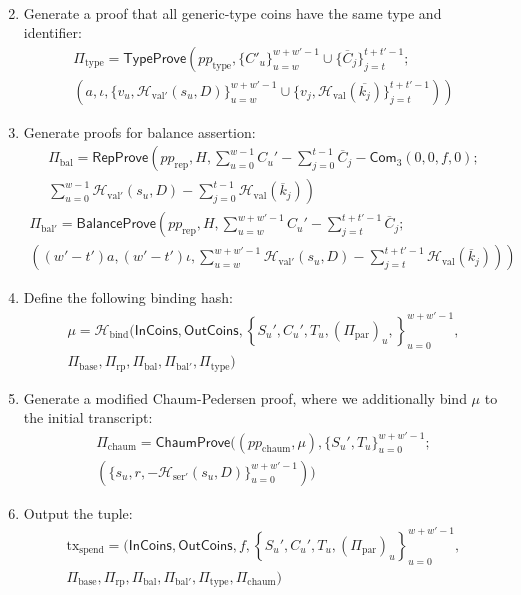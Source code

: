 \documentclass{article}
\newcommand{\func}[1]{\mathsf{#1}}
\newcommand{\com}{\func{Com}}
\newcommand{\hash}{\mathcal{H}}
\begin{document}
\begin{enumerate}
\begin{multline*}
    \end{multline*}
    \item Generate a proof that all generic-type coins have the same type and identifier:
    \begin{multline*}
        \Pi_{\text{type}} = \func{TypeProve}\left( pp_{\text{type}}, \{C'_u\}_{u=w}^{w+w'-1} \cup \{\overline{C}_j\}_{j=t}^{t+t'-1} ; \right. \\
        \left. \left( a, \iota, \{v_u, \hash_{\text{val}'}(s_u, D)\}_{u=w}^{w+w'-1} \cup \{v_j, \hash_{\text{val}}(\overline{k_j})\}_{j=t}^{t+t'-1} \right) \right)
    \end{multline*}
    \item Generate proofs for balance assertion:
    \begin{multline*}
    \Pi_{\text{bal}} = \func{RepProve}\left( pp_{\text{rep}}, H, \sum_{u=0}^{w-1} C_u' - \sum_{j=0}^{t-1} \overline{C}_j - \com_3(0,0,f,0); \right. \\
    \left. \sum_{u=0}^{w-1} \hash_{\text{val}'}(s_u,D) - \sum_{j=0}^{t-1} \hash_{\text{val}}(\overline{k}_j) \right)
    \end{multline*}
    \begin{multline*}
    \Pi_{\text{bal}'} = \func{BalanceProve}\left( pp_{\text{rep}}, H, \sum_{u=w}^{w+w'-1} C_u' - \sum_{j=t}^{t+t'-1} \overline{C}_j ; \right. \\
    \left. \left( (w' - t')a, (w' - t')\iota, \sum_{u=w}^{w+w'-1} \hash_{\text{val}'}(s_u,D) - \sum_{j=t}^{t+t'-1} \hash_{\text{val}}(\overline{k}_j) \right) \right)
    \end{multline*}
    \item Define the following binding hash:
    \begin{multline*}
        \mu = \hash_{\text{bind}}( \func{InCoins}, \func{OutCoins}, \left\{ S_u', C_u', T_u, (\Pi_{\text{par}})_u, \right\}_{u=0}^{w+w'-1}, \\
        \Pi_{\text{base}}, \Pi_{\text{rp}}, \Pi_{\text{bal}}, \Pi_{\text{bal}'}, \Pi_{\text{type}} )
    \end{multline*}
    \item Generate a modified Chaum-Pedersen proof, where we additionally bind $\mu$ to the initial transcript:
    \begin{multline*}
    \Pi_{\text{chaum}} = \func{ChaumProve}((pp_{\text{chaum}}, \mu), \{S_u', T_u\}_{u=0}^{w+w'-1} ; \\
    (\{s_u, r, -\hash_{\text{ser}'}(s_u, D)\}_{u=0}^{w+w'-1}))
    \end{multline*}
    \item Output the tuple:
    \begin{multline*}
    \text{tx}_{\text{spend}} = ( \func{InCoins}, \func{OutCoins}, f, \left\{ S_u', C_u', T_u, (\Pi_{\text{par}})_u \right\}_{u=0}^{w+w'-1}, \\
    \Pi_{\text{base}}, \Pi_{\text{rp}}, \Pi_{\text{bal}}, \Pi_{\text{bal}'}, \Pi_{\text{type}}, \Pi_{\text{chaum}} )
    \end{multline*}
\end{enumerate}
\end{document}
